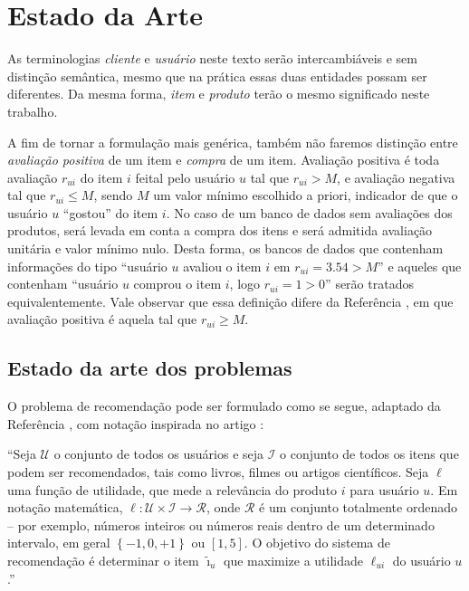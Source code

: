 \chapter[Estado da arte]{Estado da Arte}
\label{chap:estado_da_arte}

As terminologias \textit{cliente} e \textit{usuário} neste texto serão intercambiáveis e sem distinção semântica, mesmo que na prática essas duas entidades possam ser diferentes. Da mesma forma, \textit{item} e \textit{produto} terão o mesmo significado neste trabalho. 

A fim de tornar a formulação mais genérica, também não faremos distinção entre \textit{avaliação positiva} de um item e \textit{compra} de um item. Avaliação positiva é toda avaliação $r_{ui}$ do item $i$ feital pelo usuário $u$ tal que $r_{ui} > M$, e avaliação negativa tal que $r_{ui} \leq M$, sendo $M$ um valor mínimo escolhido a priori, indicador de que o usuário $u$ ``gostou'' do item $i$. No caso de um banco de dados sem avaliações dos produtos, será levada em conta a compra dos itens e será admitida avaliação unitária e valor mínimo nulo. Desta forma, os bancos de dados que contenham informações do tipo ``usuário $u$ avaliou o item $i$ em $r_{ui} = 3.54 > M$'' e aqueles que contenham ``usuário $u$ comprou o item $i$, logo $r_{ui} = 1 > 0$'' serão tratados equivalentemente. Vale observar que essa definição difere da Referência , em que avaliação positiva é aquela tal que $r_{ui} \geq M$.

\section{Estado da arte dos problemas} %
\label{sec:estado_da_arte_dos_problemas}

O problema de recomendação pode ser formulado como se segue, adaptado da Referência , com notação inspirada no artigo : 

``Seja $\mathcal{U}$ o conjunto de todos os usuários e seja $\mathcal{I}$ o conjunto de todos os itens que podem ser recomendados, tais como livros, filmes ou artigos científicos. Seja $\ell$ uma função de utilidade, que mede a relevância do produto $i$ para usuário $u$. Em notação matemática, $\ell: \mathcal{U} \times \mathcal{I} \rightarrow \mathcal{R}$, onde $\mathcal{R}$ é um  conjunto totalmente ordenado -- por exemplo, números inteiros ou números reais dentro de um determinado intervalo, em geral $\left\{-1, 0, +1\right\}$ ou $[1, 5]$. O objetivo do sistema de recomendação é determinar o item $\tilde{\imath}_u$ que maximize a utilidade $\ell_{ui}$ do usuário $u$.''

